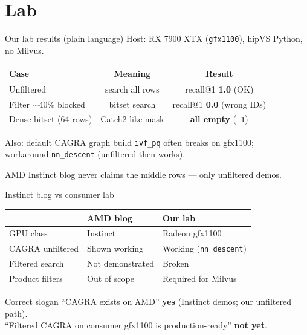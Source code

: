 \documentclass[aspectratio=169,11pt]{beamer}
\begin{document}
\section{Lab}
\begin{frame}{Our lab results (plain language)}
  \footnotesize
  Host: RX 7900 XTX (\texttt{gfx1100}), hipVS Python, no Milvus.

  \vspace{0.4em}
  \begin{center}
  \begin{tabular}{@{}lcc@{}}
    \toprule
    Case & Meaning & Result \\
    \midrule
    Unfiltered & search all rows & recall@1 \textbf{1.0} (OK) \\
    Filter $\sim$40\% blocked & bitset search & recall@1 \textbf{0.0} (wrong IDs) \\
    Dense bitset (64 rows) & Catch2-like mask & \textbf{all empty} (\texttt{-1}) \\
    \bottomrule
  \end{tabular}
  \end{center}

  \vspace{0.5em}
  Also: default CAGRA graph build \texttt{ivf\_pq} often breaks on gfx1100;\\
  workaround \texttt{nn\_descent} (unfiltered then works).

  \vspace{0.4em}
  AMD Instinct blog never claims the middle rows --- only unfiltered demos.
\end{frame}

\begin{frame}{Instinct blog vs consumer lab}
  \begin{center}
  \begin{tabular}{@{}p{3.6cm}p{4.2cm}p{4.2cm}@{}}
    \toprule
    & \textbf{AMD blog} & \textbf{Our lab} \\
    \midrule
    GPU class & Instinct & Radeon gfx1100 \\
    CAGRA unfiltered & Shown working & Working (\texttt{nn\_descent}) \\
    Filtered search & Not demonstrated & Broken \\
    Product filters & Out of scope & Required for Milvus \\
    \bottomrule
  \end{tabular}
  \end{center}

  \vspace{0.8em}
  \begin{block}{Correct slogan}
    ``CAGRA exists on AMD'' \textbf{yes} (Instinct demos; our unfiltered path).\\
    ``Filtered CAGRA on consumer gfx1100 is production-ready'' \textbf{not yet}.
  \end{block}
\end{frame}
\end{document}
